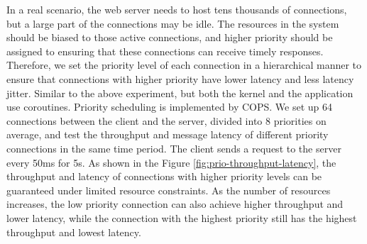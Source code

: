 \documentclass[sigconf,review,anonymous]{acmart}
\begin{document}
In a real scenario, the web server needs to host tens thousands of connections, but a large part of the connections may be idle. The resources in the system should be biased to those active connections, and higher priority should be assigned to ensuring that these connections can receive timely responses. Therefore, we set the priority level of each connection in a hierarchical manner to ensure that connections with higher priority have lower latency and less latency jitter. Similar to the above experiment, but both the kernel and the application use coroutines. Priority scheduling is implemented by COPS. We set up 64 connections between the client and the server, divided into 8 priorities on average, and test the throughput and message latency of different priority connections in the same time period. The client sends a request to the server every 50ms for 5s. As shown in the Figure \ref{fig:prio-throughput-latency}, the throughput and latency of connections with higher priority levels can be guaranteed under limited resource constraints. As the number of resources increases, the low priority connection can also achieve higher throughput and lower latency, while the connection with the highest priority still has the highest throughput and lowest latency.
\end{document}
